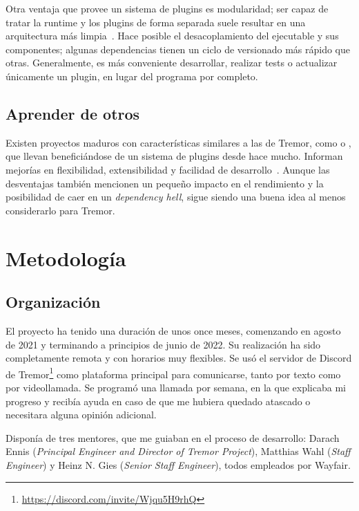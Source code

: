 Otra ventaja que provee un sistema de plugins es modularidad; ser capaz de
tratar la runtime y los plugins de forma separada suele resultar en una
arquitectura más limpia~\cite{baldwin2000design}. Hace posible el
desacoplamiento del ejecutable y sus componentes; algunas dependencias tienen un
ciclo de versionado más rápido que otras. Generalmente, es más conveniente
desarrollar, realizar tests o actualizar únicamente un plugin, en lugar del
programa por completo.

\subsection{Aprender de otros}

Existen proyectos maduros con características similares a las de Tremor, como
\textcite{nginx} o \textcite{apachehttpserver}, que llevan beneficiándose de un
sistema de plugins desde hace mucho. Informan mejorías en flexibilidad,
extensibilidad y facilidad de
desarrollo~\cite{nginxPluginsAdvantages}\cite{apachePluginsAdvantages}. Aunque
las desventajas también mencionen un pequeño impacto en el rendimiento y la
posibilidad de caer en un \emph{dependency hell}, sigue siendo una buena idea al
menos considerarlo para Tremor.

\section{Metodología}

\subsection{Organización}

El proyecto ha tenido una duración de unos once meses, comenzando en agosto de
2021 y terminando a principios de junio de 2022. Su realización ha sido
completamente remota y con horarios muy flexibles. Se usó el servidor de Discord
de Tremor\footnote{\url{https://discord.com/invite/Wjqu5H9rhQ}} como plataforma
principal para comunicarse, tanto por texto como por videollamada. Se programó
una llamada por semana, en la que explicaba mi progreso y recibía ayuda en caso
de que me hubiera quedado atascado o necesitara alguna opinión adicional.

Disponía de tres mentores, que me guiaban en el proceso de desarrollo: Darach
Ennis (\emph{Principal Engineer and Director of Tremor Project}), Matthias Wahl
(\emph{Staff Engineer}) y Heinz N. Gies (\emph{Senior Staff Engineer}), todos
empleados por Wayfair.

